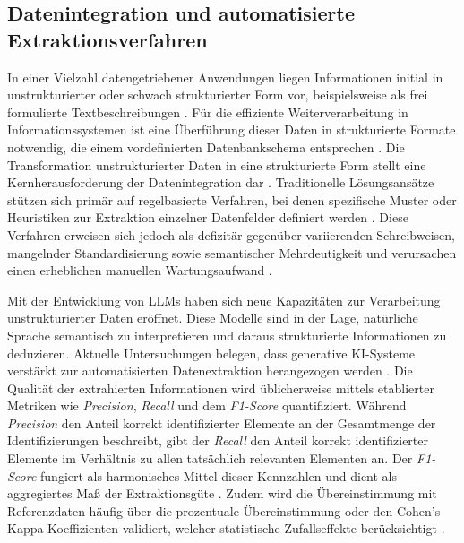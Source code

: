 \subsection{Datenintegration und automatisierte Extraktionsverfahren}
In einer Vielzahl datengetriebener Anwendungen liegen Informationen initial in unstrukturierter oder schwach strukturierter Form vor, beispielsweise als frei formulierte Textbeschreibungen \parencite[vgl.][S. 2]{ferrara2014web}. Für die effiziente Weiterverarbeitung in Informationssystemen ist eine Überführung dieser Daten in strukturierte Formate notwendig, die einem vordefinierten Datenbankschema entsprechen \parencite[vgl.][S. 3]{doan2012principles}. Die Transformation unstrukturierter Daten in eine strukturierte Form stellt eine Kernherausforderung der Datenintegration dar \parencite[vgl.][S. 1--15]{doan2012principles}. Traditionelle Lösungsansätze stützen sich primär auf regelbasierte Verfahren, bei denen spezifische Muster oder Heuristiken zur Extraktion einzelner Datenfelder definiert werden \parencite[vgl.][S. 9]{ferrara2014web}. Diese Verfahren erweisen sich jedoch als defizitär gegenüber variierenden Schreibweisen, mangelnder Standardisierung sowie semantischer Mehrdeutigkeit und verursachen einen erheblichen manuellen Wartungsaufwand \parencite[vgl.][S. 12--14]{ferrara2014web}.

Mit der Entwicklung von LLMs haben sich neue Kapazitäten zur Verarbeitung unstrukturierter Daten eröffnet. Diese Modelle sind in der Lage, natürliche Sprache semantisch zu interpretieren und daraus strukturierte Informationen zu deduzieren. Aktuelle Untersuchungen belegen, dass generative KI-Systeme verstärkt zur automatisierten Datenextraktion herangezogen werden \parencite[vgl.][]{data_extraction_ai}. Die Qualität der extrahierten Informationen wird üblicherweise mittels etablierter Metriken wie \textit{Precision}, \textit{Recall} und dem \textit{F1-Score} quantifiziert. Während \textit{Precision} den Anteil korrekt identifizierter Elemente an der Gesamtmenge der Identifizierungen beschreibt, gibt der \textit{Recall} den Anteil korrekt identifizierter Elemente im Verhältnis zu allen tatsächlich relevanten Elementen an. Der \textit{F1-Score} fungiert als harmonisches Mittel dieser Kennzahlen und dient als aggregiertes Maß der Extraktionsgüte \parencite[vgl.][S. 1283]{data_extraction_ai}. Zudem wird die Übereinstimmung mit Referenzdaten häufig über die prozentuale Übereinstimmung oder den Cohen's Kappa-Koeffizienten validiert, welcher statistische Zufallseffekte berücksichtigt \parencite[vgl.][S. 1283]{data_extraction_ai}.

